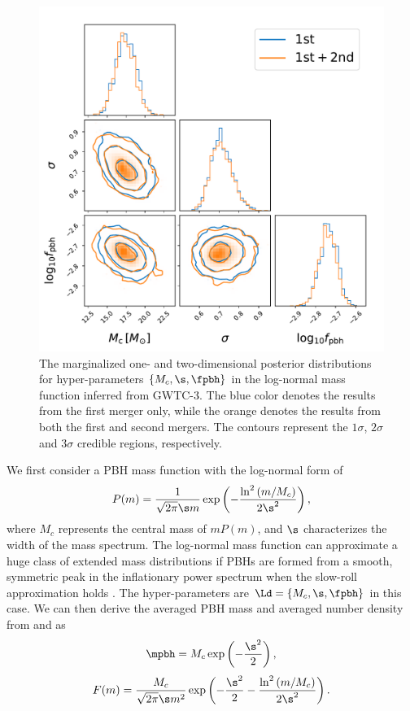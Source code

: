 \documentclass[
reprint,           %
superscriptaddress,%
amsmath,           %
amssymb,           %
aps,               %
prd,               %
notitlepage,       %
longbibliography,  %
floatfix,          %
nofootinbib,
]{revtex4-1}
\def\({\left(}
\def\){\right)}
\def\e{\begin{equation}}
\def\q{\end{equation}}
\begin{document}
\begin{figure}[tbp!]
	\centering
	\includegraphics[width=\linewidth]{post-log.pdf}
	\caption{\label{posterior-log}The marginalized one- and two-dimensional posterior distributions for hyper-parameters $\{M_c, \s, \fpbh\}$ in the log-normal mass function inferred from GWTC-3. The blue color denotes the results from the first merger only, while the orange denotes the results from both the first and second mergers. The contours represent the $1\sigma$, $2\sigma$ and $3\sigma$ credible regions, respectively.}
\end{figure}

We first consider a PBH mass function with the log-normal form of \cite{Dolgov:1992pu}
\e\label{log}
P(m) = \frac{1}{\sqrt{2\pi} \s m} \exp \(-\frac{\ln^2\(m/M_c\)}{2\s^2}\),
\q
where $M_c$ represents the central mass of $m P(m)$, and $\s$ characterizes the width of the mass spectrum.
The log-normal mass function can approximate a huge class of extended mass distributions if PBHs are formed from a smooth, symmetric peak in the inflationary power spectrum when the slow-roll approximation holds \cite{Green:2016xgy,Carr:2017jsz,Kannike:2017bxn}.
The hyper-parameters are $\Ld = \{M_c, \s, \fpbh\}$ in this case. 
We can then derive the averaged PBH mass and averaged number density from  and  as
\e
\mpbh = M_c \exp \(-\frac{\s^2}{2}\),
\q
\e 
F(m) = \frac{M_c}{\sqrt{2\pi} \s m^2} \exp \(-\frac{\s^2}{2}-\frac{\ln^2\(m/M_c\)}{2\s^2}\).
\q
\end{document}
